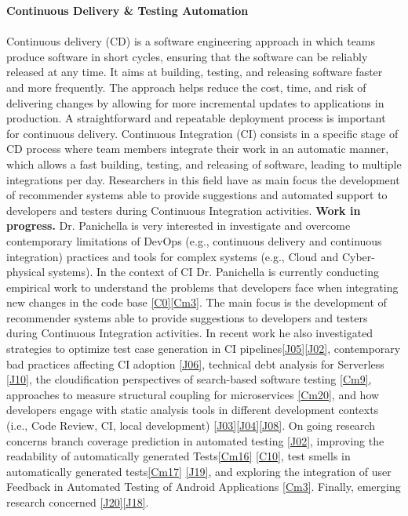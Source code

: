 \documentclass[10pt]{article}
\newcommand{\blankline}{\quad\pagebreak[3]}
\begin{document}
\textbf{Continuous Delivery \& Testing Automation}
\blankline\\\\
Continuous delivery (CD) is a software engineering approach in which teams produce software in short cycles, ensuring that the software can be reliably released at any time. It aims at building, testing, and releasing software faster and more frequently. The approach helps reduce the cost, time, and risk of delivering changes by allowing for more incremental updates to applications in production. A straightforward and repeatable deployment process is important for continuous delivery. Continuous Integration (CI) consists in a specific stage of CD process where team members integrate their work in an automatic manner, which allows a fast building, testing, and releasing of software, leading to multiple integrations per day. Researchers in this field have as main focus the development of recommender systems able to provide suggestions and automated support to developers and testers during Continuous Integration activities. 
   \textbf{Work in progress.}  
   Dr. Panichella is very interested in investigate and overcome contemporary limitations of DevOps (e.g., continuous delivery and continuous integration) practices and tools for complex systems (e.g., Cloud and Cyber-physical systems). 
   In the context of CI Dr. Panichella is currently conducting empirical work to understand the problems that developers face when integrating new changes in the code base \ref{C0}\ref{Cm3}. The main focus is the development of recommender systems able to provide suggestions to developers and testers during Continuous Integration activities. In recent work he also investigated strategies to optimize test case generation in CI pipelines\ref{J05}\ref{J02},  contemporary bad practices affecting CI adoption \ref{J06}, technical debt analysis for Serverless \ref{J10},   the cloudification perspectives of search-based software testing \ref{Cm9}\label{Cm15}, approaches to measure structural coupling for microservices \ref{Cm20}, and how developers engage with static analysis tools in different development contexts (i.e., Code Review, CI, local development) \ref{J03}\ref{J04}\ref{J08}.
   On going research concerns branch coverage prediction in automated testing \ref{J02},  improving the readability of automatically generated Tests\ref{Cm16} \ref{C10}, test smells in automatically generated tests\ref{Cm17} \ref{J19}, and exploring the integration of user Feedback in Automated Testing of Android Applications \ref{Cm3}.  Finally, emerging research concerned \ref{J20}\ref{J18}.
    \\
\end{document}
